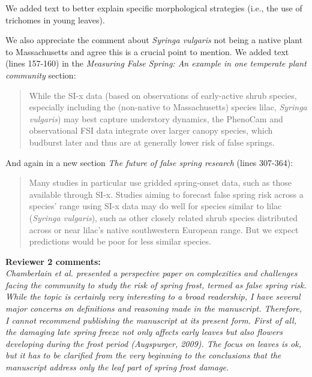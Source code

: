 \documentclass[11pt,a4paper]{article}
\begin{document}
We added text to better explain specific morphological strategies (i.e., the use of trichomes in young leaves). 

We also appreciate the comment about \textit{Syringa vulgaris} not being a native plant to Massachusetts and agree this is a crucial point to mention. We added text (lines 157-160) in the \textit{Measuring False Spring: An example in one temperate plant community} section:\\

\begin{quotation}
While the SI-x data (based on observations of early-active shrub species, especially including the (non-native to Massachusetts) species lilac, \emph{Syringa vulgaris}) may best capture understory dynamics, the PhenoCam and observational FSI data integrate over larger canopy species, which budburst later and thus are at generally lower risk of false springs.
\end{quotation}

And again in a new section \textit{The future of false spring research} (lines 307-364):

\begin{quotation}
Many studies in particular use gridded spring-onset data, such as those available through SI-x. Studies aiming to forecast false spring risk across a species' range using SI-x data may do well for species similar to lilac (\emph{Syringa vulgaris}), such as other closely related shrub species distributed across or near lilac's native southwestern European range. But we expect predictions would be poor for less similar species.
\end{quotation}


\textbf {Reviewer 2 comments:} \\

\textit{Chamberlain et al. presented a perspective paper on complexities and challenges facing the community to study the risk of spring frost, termed as false spring risk. While the topic is certainly very interesting to a broad readership, I have several major concerns on definitions and reasoning made in the manuscript. Therefore, I cannot recommend publishing the manuscript at its present form. First of all, the damaging late spring freeze not only affects early leaves but also flowers developing during the frost period (Augspurger, 2009). The focus on leaves is ok, but it has to be clarified from the very beginning to the conclusions that the manuscript address only the leaf part of spring frost damage.}\\
\end{document}
